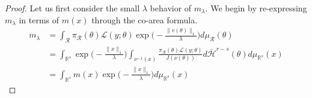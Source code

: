\documentclass[10pt,fleqn]{article} \pdfoutput=1
\DeclareMathOperator{\1}{\mathbbm{1}} \DeclareMathOperator{\bigO}{\mc O}
\begin{document}
\begin{proof}
	Let us first consider the small $\lambda$ behavior of $m_\lambda.$ We begin
	by re-expressing $m_\lambda$ in terms of $m(x)$ through the co-area
	formula.  \begin{align*} m_\lambda & = \int_\mathcal{R}
		\pi_\mathcal{R}(\theta) \mathcal{L}(y;\theta)
		\exp\bigg(-\frac{\|v(\theta)\|_1}{\lambda}\bigg)
		d\mu_\mathcal{R}(\theta)                                 \\ &= \int_{\mathbb{R}^s}
		\exp\bigg(-\frac{\|x\|_1}{\lambda}\bigg) \int_{\nu^{-1}(x)}
		\frac{\pi_\mathcal{R}(\theta)
			\mathcal{L}(y;\theta)}{J(\nu(\theta))}
		d\bar{\mathcal{H}}^{r-s}(\theta) d\mu_{\mathbb{R}^s} (x) \\
		          & =\int_{\mathbb{R}^s}m(x)
		\exp\bigg(-\frac{\|x\|_1}{\lambda}\bigg)d\mu_{\mathbb{R}^s}(x)\end{align*}


\end{proof}
\end{document}
